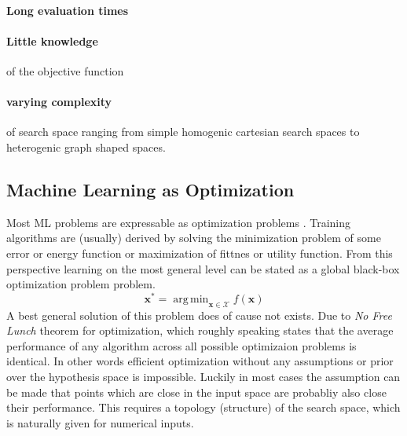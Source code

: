 \documentclass[english]{article}
\newcommand{\x}{\mathbf{x}}
\DeclareMathOperator*{\argmin}{arg\,min}
\begin{document}
\paragraph{Long evaluation times}
\paragraph{Little knowledge} of the objective function
\paragraph{varying complexity} of search space ranging from simple homogenic cartesian search spaces to heterogenic graph shaped spaces.

\subsection{Machine Learning as Optimization}
Most \acf{ML} problems are expressable as optimization problems \cite{bennett_interplay_2006}. Training algorithms are (usually) derived by solving the minimization problem of some error or energy function or maximization of fittnes or utility function. From this perspective learning on the most general level can be stated as a global black-box optimization problem problem.
$$\x^* = \argmin_{\x \in \mathcal{X}} f(\x)$$
A best general solution of this problem does of cause not exists. Due to \textit{No Free Lunch} theorem for optimization, which roughly speaking states that the average performance of any algorithm across all possible optimizaion problems is identical. In other words efficient optimization without any assumptions or prior over the hypothesis space is impossible. Luckily in most cases the assumption can be made that points which are close in the input space are probabliy also close their performance. This requires a topology (structure) of the search space, which is naturally given for numerical inputs.
\end{document}
